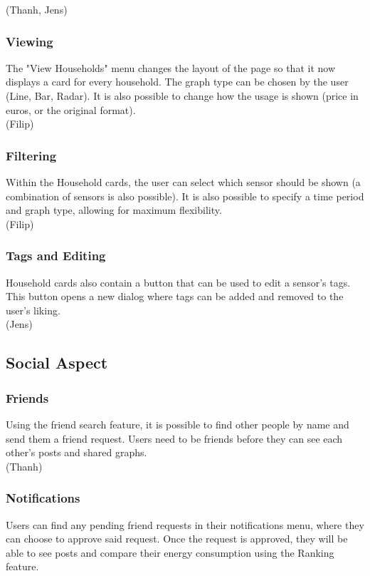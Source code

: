 \documentclass[11pt]{article}
\begin{document}
		(Thanh, Jens)

	\subsubsection{Viewing}
		The "View Households" menu changes the layout of the page so that it now displays a card for every household.
		The graph type can be chosen by the user (Line, Bar, Radar).
		It is also possible to change how the usage is shown (price in euros, or the original format).\\

		(Filip)

	\subsubsection{Filtering}
		Within the Household cards, the user can select which sensor should be shown (a combination of sensors is also possible).
		It is also possible to specify a time period and graph type, allowing for maximum flexibility.\\

		(Filip)

	\subsubsection{Tags and Editing}
		Household cards also contain a button that can be used to edit a sensor's tags.
		This button opens a new dialog where tags can be added and removed to the user's liking.\\

		(Jens)

  \subsection{Social Aspect}
	\subsubsection{Friends}
		Using the friend search feature, it is possible to find other people by name and send them a friend request.
		Users need to be friends before they can see each other's posts and shared graphs.\\

		(Thanh)

	\subsubsection{Notifications}
		Users can find any pending friend requests in their notifications menu, where they can choose to approve said request.
		Once the request is approved, they will be able to see posts and compare their energy consumption using the Ranking feature.\\
\end{document}

